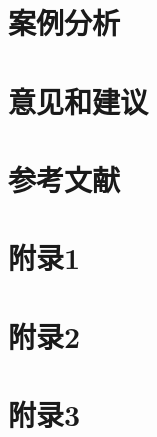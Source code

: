 \documentclass[UTF8]{ctexart}
\begin{document}
	
	
	\section{案例分析}\label{sec4}
	
	
	\section{意见和建议}\label{sec5}
	
	
	\section{参考文献}\label{sec:sec4}
	
	\begin{appendices} 
		\section{附录1} 
		
		\section{附录2} 
		
		\section{附录3} 
		
	\end{appendices}
	
\end{document}
